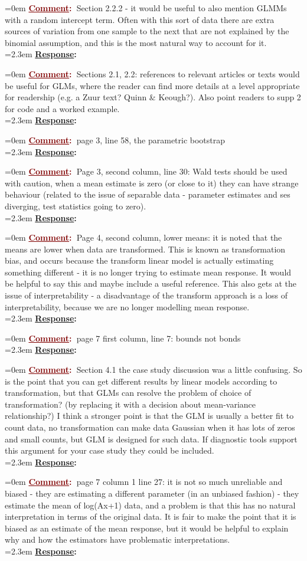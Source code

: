 \documentclass[12pt]{article}
\newcommand{\comment}[0]{\vspace{1em} \noindent \hangindent=0em \textbf{\textcolor{Maroon}{\uline{Comment}:~}}}
\newcommand{\response}[0]{\\\vspace{0.1em} \hangindent=2.3em \textbf{\textcolor{NavyBlue}{\uline{Response}:~}}}
\begin{document}
\comment Section 2.2.2 - it would be useful to also mention GLMMs with a random intercept term.  Often with this sort of data there are extra sources of variation from one sample to the next that are not explained by the binomial assumption, and this is the most natural way to account for it.
\response

\comment Sections 2.1, 2.2: references to relevant articles or texts would be useful for GLMs, where the reader can find more details at a level appropriate for readership (e.g. a Zuur text?  Quinn \& Keough?).  Also point readers to supp 2 for code and a worked example.
\response

\comment page 3, line 58, the parametric bootstrap
\response

\comment Page 3, second column, line 30: Wald tests should be used with caution, when a mean estimate is zero (or close to it) they can have strange behaviour (related to the issue of separable data - parameter estimates and ses diverging, test statistics going to zero).
\response

\comment Page 4, second column, lower means: it is noted that the means are lower when data are transformed.  This is known as transformation bias, and occurs because the transform linear model is actually estimating something different - it is no longer trying to estimate mean response.  It would be helpful to say this and maybe include a useful reference.  This also gets at the issue of interpretability - a disadvantage of the transform approach is a loss of interpretability, because we are no longer modelling mean response.
\response

\comment page 7 first column, line 7: bounds not bonds
\response

\comment Section 4.1 the case study discussion was a little confusing.  So is the point that you can get different results by linear models according to transformation, but that GLMs can resolve the problem of choice of transformation?  (by replacing it with a decision about mean-variance relationship?)  I think a stronger point is that the GLM is usually a better fit to count data, no transformation can make data Gaussian when it has lots of zeros and small counts, but GLM is designed for such data.  If diagnostic tools support this argument for your case study they could be included.
\response

\comment page 7 column 1 line 27: it is not so much unreliable and biased - they are estimating a different parameter (in an unbiased fashion) - they estimate the mean of log(Ax+1) data, and a problem is that this has no natural interpretation in terms of the original data.  It is fair to make the point that it is biased as an estimate of the mean response, but it would be helpful to explain why and how the estimators have problematic interpretations.
\response
\end{document}
